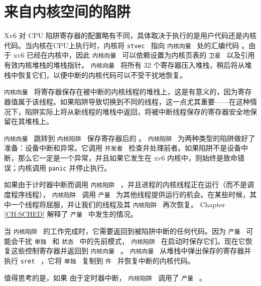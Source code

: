 \documentclass[UTF8]{article}
\begin{document}
   \section{来自内核空间的陷阱  }   
    \label{s:ktraps}     

Xv6 对 CPU 陷阱寄存器的配置略有不同，具体取决于执行的是用户代码还是内核代码。当内核在CPU上执行时，内核将 {    \tt    stvec   } 指向 {    \tt    内核向量   } 处的汇编代码
        。由于 xv6 已经在内核中，因此  {    \tt    内核向量   }  可以依赖设置为内核页表的  {    \tt    卫星   }  以及引用有效内核堆栈的堆栈指针。
  {    \tt    内核向量   }  将所有 32 个寄存器压入堆栈，稍后将从堆栈中恢复它们，以便中断的内核代码可以不受干扰地恢复。  

 {    \tt    内核向量   }  将寄存器保存在被中断的内核线程的堆栈上，这是有意义的，因为寄存器值属于该线程。如果陷阱导致切换到不同的线程，这一点尤其重要——在这种情况下，陷阱实际上将从新线程的堆栈中返回，将被中断线程保存的寄存器安全地保留在其堆栈上。  

 {    \tt    内核向量   }  跳转到  {    \tt    内核陷阱   } 
 保存寄存器后的       。
  {    \tt    内核陷阱   }  为两种类型的陷阱做好了准备：设备中断和异常。它调用
  {    \tt    开发者   } 
        检查并处理前者。如果陷阱不是设备中断，那么它一定是一个异常，并且如果它发生在 xv6 内核中，则始终是致命错误；内核调用    \lstinline{panic}    并停止执行。  

如果由于计时器中断而调用  {    \tt    内核陷阱   } ，并且进程的内核线程正在运行（而不是调度程序线程），
  {    \tt    内核陷阱   }  调用  {    \tt    产量   }  为其他线程提供运行的机会。在某些时候，其中一个线程将屈服，并让我们的线程及其  {    \tt    内核陷阱   }  再次恢复。 Chapter~    \ref{CH:SCHED}    解释了  {    \tt    产量   }  中发生的情况。  

当  {    \tt    内核陷阱   }  的工作完成时，它需要返回到被陷阱中断的任何代码。因为  {    \tt    产量   }  可能会干扰  {    \tt    单独   }  和  {    \tt    状态   }  中的先前模式，
  {    \tt    内核陷阱   }  在启动时保存它们。现在它恢复这些控制寄存器并返回到  {    \tt    内核向量   } 
        。
  {    \tt    内核向量   }  从堆栈中弹出保存的寄存器并执行  {    \tt    sret   }  ，它将  {    \tt    单独   }  复制到  {    \tt    件   }  并恢复中断的内核代码。  

值得思考的是，如果
 由于定时器中断， {    \tt    内核陷阱   }  调用了  {    \tt    产量   } 。  
\end{document}
